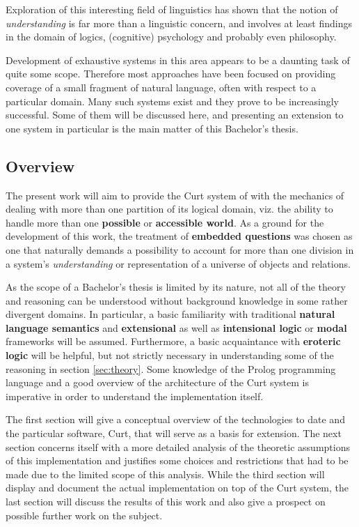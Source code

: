 \documentclass[a4paper]{article}
\newcommand{\term}[1]{\textsf{\textbf{#1}}} %
\newcommand{\pn}{\textsf} %
\newcommand{\curt}{\pn{Curt}}
\newcommand{\prol}{\pn{Prolog}}
\theoremstyle{remark}
\theoremstyle{remark}
\theoremstyle{definition}
\theoremstyle{definition}
\begin{document}
Exploration of this  interesting field of linguistics has shown that
the notion of \emph{understanding} is far more than a linguistic concern, and
involves at least findings in the domain of logics, (cognitive) psychology and
probably even philosophy.

Development of exhaustive systems in this area appears to be a daunting task of
quite some scope. Therefore most approaches have been focused on providing
coverage of a small fragment of natural language, often with respect to a
particular domain. Many such systems exist and they prove to be increasingly
successful. Some of them will be discussed here, and presenting an extension to
one system in particular is the main matter of this Bachelor's thesis.

\subsection{Overview}

The present work will aim to provide the \curt{} system of
\cite{blackburnbos:cl1} with the mechanics of dealing with more than one
partition of its logical domain, viz. the ability to handle more than one
\term{possible} or \term{accessible world}. As a ground for the development of this
work, the treatment of \term{embedded questions} was chosen as one that
naturally demands a possibility to account for more than one division in a
system's \emph{understanding} or representation of a universe of objects and
relations.

As the scope of a Bachelor's thesis is limited by its nature, not all of the
theory and reasoning can be understood without background knowledge in some
rather divergent domains. In particular, a basic familiarity with traditional
\term{natural language semantics} and \term{extensional} as well as
\term{intensional logic} or \term{modal} frameworks will be assumed.
Furthermore, a basic acquaintance with \term{eroteric logic} will be helpful,
but not strictly necessary in understanding some of the reasoning in section
\ref{sec:theory}.  Some knowledge of the \prol{} programming language and a good
overview of the architecture of the \curt{} system is imperative in order to
understand the implementation itself.

The first section will give a conceptual overview of the technologies to date
and the particular software, \curt, that will serve as a basis for extension.
The next section concerns itself with a more detailed analysis of the theoretic
assumptions of this implementation and justifies some choices and restrictions
that had to be made due to the limited scope of this analysis. While the
third section will display and document the actual implementation on top of the
\curt{} system, the last section will discuss the results of this work and also
give a prospect on possible further work on the subject.
\end{document}
